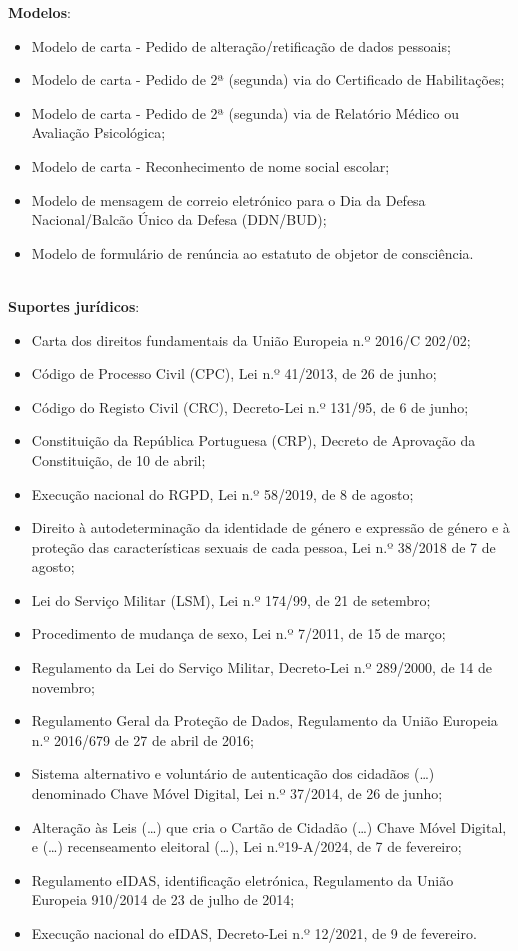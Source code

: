 \newpage

\textbf{Modelos}:
\begin{itemize}
	\item Modelo de carta - Pedido de alteração/retificação de dados pessoais;
	\item Modelo de carta - Pedido de 2ª (segunda) via do Certificado de Habilitações;
	\item Modelo de carta - Pedido de 2ª (segunda) via de Relatório Médico ou Avaliação Psicológica;
	\item Modelo de carta - Reconhecimento de nome social escolar;
	\item Modelo de mensagem de correio eletrónico para o Dia da Defesa Nacional/Balcão Único da Defesa (DDN/BUD);
	\item Modelo de formulário de renúncia ao estatuto de objetor de consciência.
\end{itemize}
\leavevmode\\
\textbf{Suportes jurídicos}:
\begin{itemize}
	\item Carta dos direitos fundamentais da União Europeia n.º 2016/C 202/02;
	\item Código de Processo Civil (CPC), Lei n.º 41/2013, de 26 de junho;
	\item Código do Registo Civil (CRC), Decreto-Lei n.º 131/95, de 6 de junho;
	\item Constituição da República Portuguesa (CRP), Decreto de Aprovação da Constituição, de 10 de abril;
	\item Execução nacional do RGPD, Lei n.º 58/2019, de 8 de agosto;
	\item Direito à autodeterminação da identidade de género e expressão de género e à proteção das características sexuais de cada pessoa, Lei n.º 38/2018 de 7 de agosto;
	\item Lei do Serviço Militar (LSM), Lei n.º 174/99, de 21 de setembro;
	\item Procedimento de mudança de sexo, Lei n.º 7/2011, de 15 de março;
	\item Regulamento da Lei do Serviço Militar, Decreto-Lei n.º 289/2000, de 14 de novembro;
	\item Regulamento Geral da Proteção de Dados, Regulamento da União Europeia n.º 2016/679 de 27 de abril de 2016;
	\item Sistema alternativo e voluntário de autenticação dos cidadãos (\ldots) denominado Chave Móvel Digital, Lei n.º 37/2014, de 26 de junho;
	\item Alteração às Leis (\ldots) que cria o Cartão de Cidadão (\ldots) Chave Móvel Digital, e (\ldots) recenseamento eleitoral (\ldots), Lei n.º19-A/2024, de 7 de fevereiro;
	\item Regulamento eIDAS, identificação eletrónica, Regulamento da União Europeia 910/2014 de 23 de julho de 2014;
	\item Execução nacional do eIDAS, Decreto-Lei n.º 12/2021, de 9 de fevereiro.
\end{itemize}


